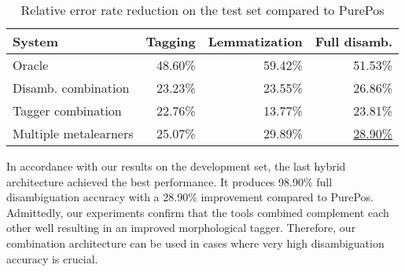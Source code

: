 \begin{table}[h]
\centering
\caption{Relative error rate reduction on the test set compared to PurePos}\label{tab:eval}
\begin{tabular}{l r r r}
\hline
System & Tagging & Lemmatization & Full disamb. \\
\hline
Oracle & 48.60\% & 59.42\% & 51.53\% \\
Disamb. combination & 23.23\% & 23.55\% & 26.86\% \\
Tagger combination & 22.76\% & 13.77\% & 23.81\% \\
Multiple metalearners & 25.07\% & 29.89\% & \underline{28.90\%} \\
\hline
\end{tabular}
\end{table}

In accordance with our results on the development set, the last hybrid architecture achieved the best performance. It produces 98.90\% full disambiguation accuracy with a 28.90\% improvement compared to PurePos. 
Admittedly, our experiments confirm that the tools combined complement each other well resulting in an improved morphological tagger. 
Therefore, our combination architecture can be used in cases where very high disambiguation accuracy is crucial.








 

 

 

 
